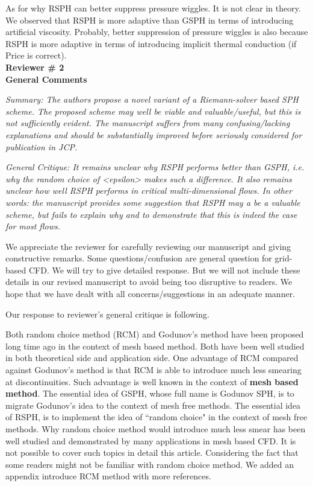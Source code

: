 \documentclass[10pt,a4paper]{article}
\begin{document}
As for why RSPH can better suppress pressure wiggles. It is not clear in theory. We observed that RSPH is more adaptive than GSPH in terms of introducing artificial viscosity. Probably, better suppression of pressure wiggles is also because RSPH is more adaptive in terms of introducing implicit thermal conduction (if Price is correct). 
\\[12pt]

\textbf{\Large Reviewer \# 2}\\[3pt]

\textbf{\large General Comments}

\textit{Summary: The authors propose a novel variant of a Riemann-solver based SPH scheme. The proposed scheme may well be viable and valuable/useful, but this is not sufficiently evident. The manuscript suffers from many confusing/lacking explanations and should be
substantially improved before seriously considered for publication in JCP.}

\textit{General Critique:
It remains unclear why RSPH performs better than GSPH, i.e. why the random choice of <epsilon> makes such a difference. It also remains unclear how well RSPH performs in critical multi-dimensional flows. In other words: the manuscript provides some suggestion that RSPH may a be a valuable scheme, but fails to explain why and to demonstrate that this is indeed the case for most flows.}

We appreciate the reviewer for carefully reviewing our manuscript and giving constructive remarks. Some questions/confusion are general question for grid-based CFD. We will try to give detailed response. But we will not include these details in our revised manuscript to avoid being too disruptive to readers. We hope that we have dealt with all concerns/suggestions in an adequate manner.

Our response to reviewer's general critique is following. 

Both random choice method (RCM) and Godunov's method have been proposed long time ago in the context of mesh based method. Both have been well studied in both theoretical side and application side. One advantage of RCM compared against Godunov's method is that RCM is able to introduce much less smearing at discontinuities. Such advantage is well known in the context of \textbf{mesh based method}.
The essential idea of GSPH, whose full name is Godunov SPH, is to migrate Godunov's idea to the context of mesh free methods. The essential idea of RSPH, is to implement the idea of ``random choice" in the context of mesh free methods. Why random choice method would introduce much less smear has been well studied and demonstrated by many applications in mesh based CFD. It is not possible to cover such topics in detail this article.
Considering the fact that some readers might not be familiar with random choice method. We added an appendix introduce RCM method with more references.
\end{document}
